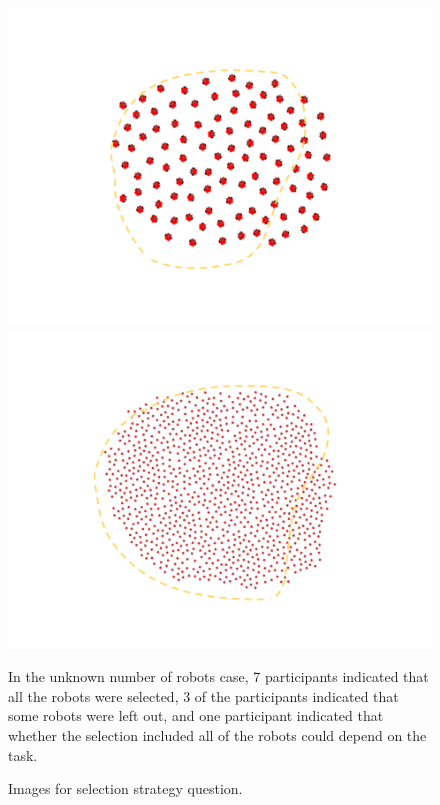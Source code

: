 \begin{subfigure}{0.48\textwidth}
		\includegraphics[width=\linewidth]{../Selection_Fuzz_100.png}
		\includegraphics[width=\linewidth]{../Selection_Fuzz_1000.png}
		\caption{Images for selection strategy question.}
	\label{strategy_question}

In the unknown number of robots case, 7 participants indicated that all the robots were selected, 3 of the participants indicated that some robots were left out, and one participant indicated that whether the selection included all of the robots could depend on the task. 


\end{subfigure}
